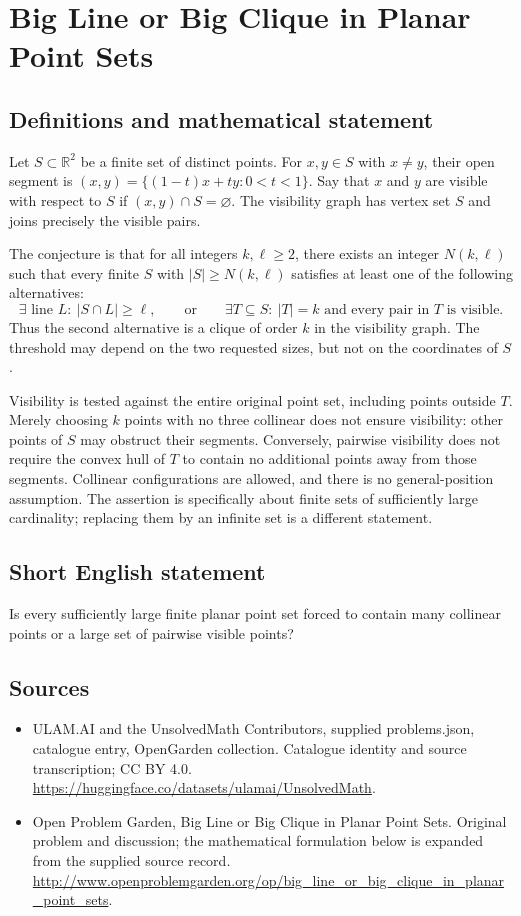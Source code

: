 \documentclass[11pt,a4paper]{article}
\begin{document}
\section*{Big Line or Big Clique in Planar Point Sets}\label{statement}

\subsection{Definitions and mathematical statement}
Let $S\subset\mathbb R^2$ be a finite set of distinct points. For
$x,y\in S$ with $x\ne y$, their open segment is
$(x,y)=\{(1-t)x+ty:0<t<1\}$. Say that $x$ and $y$ are visible with
respect to $S$ if $(x,y)\cap S=\varnothing$. The visibility graph has
vertex set $S$ and joins precisely the visible pairs.

The conjecture is that for all integers $k,\ell\ge2$, there exists an
integer $N(k,\ell)$ such that every finite $S$ with $|S|\ge N(k,\ell)$
satisfies at least one of the following alternatives:
\[
 \exists\text{ line }L:\ |S\cap L|\ge\ell,
 \qquad\text{or}\qquad
 \exists T\subseteq S:\ |T|=k\text{ and every pair in }T\text{ is visible}.
\]
Thus the second alternative is a clique of order $k$ in the visibility
graph. The threshold may depend on the two requested sizes, but not on
the coordinates of $S$.

Visibility is tested against the entire original point set, including
points outside $T$. Merely choosing $k$ points with no three collinear
does not ensure visibility: other points of $S$ may obstruct their
segments. Conversely, pairwise visibility does not require the convex hull
of $T$ to contain no additional points away from those segments.
Collinear configurations are allowed, and there is no general-position
assumption. The assertion is specifically about finite sets of sufficiently
large cardinality; replacing them by an infinite set is a different statement.
\subsection{Short English statement}
Is every sufficiently large finite planar point set forced to contain many collinear points or a large set of pairwise visible points?
\subsection{Sources}
\begin{itemize}
\item[S1] ULAM.AI and the UnsolvedMath Contributors, supplied problems.json, catalogue entry, OpenGarden collection. Catalogue identity and source transcription; CC BY 4.0.
\url{https://huggingface.co/datasets/ulamai/UnsolvedMath}.
\item[S2] Open Problem Garden, Big Line or Big Clique in Planar Point Sets. Original problem and discussion; the mathematical formulation below is expanded from the supplied source record.
\url{http://www.openproblemgarden.org/op/big_line_or_big_clique_in_planar_point_sets}.
\end{itemize}
\end{document}

